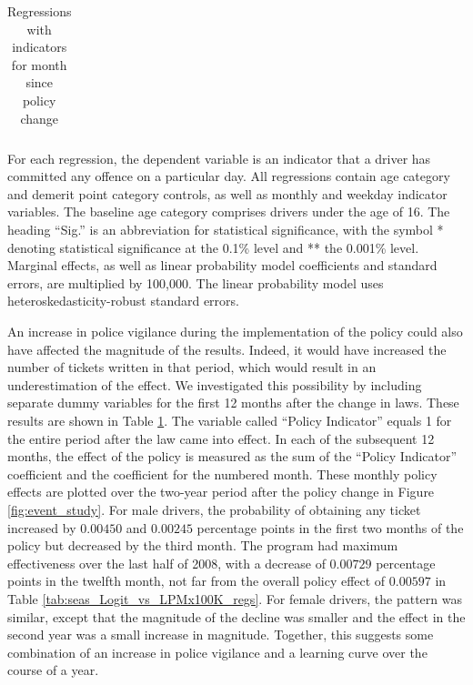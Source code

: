 \documentclass{cje}
\begin{document}
\begin{table}
\begin{tabular}{l r r r r l r r l}
\hline 

\end{tabular} 
\caption{Regressions with indicators for month since policy change} 
For each regression, the dependent variable is an indicator that a driver has committed  
any offence on a particular day.  
All regressions contain age category and demerit point category controls, 
as well as monthly and weekday indicator variables. 
The baseline age category comprises drivers under the age of 16. 
The heading ``Sig.'' is an abbreviation for statistical significance, with 
the symbol * denoting statistical significance at the 0.1\% level 
and ** the 0.001\% level. 
Marginal effects, as well as linear probability model coefficients and standard errors, are  
multiplied by 100,000.  
The linear probability model uses heteroskedasticity-robust standard errors. 
\label{tab:seas_Logit_vs_LPMx100K_event_month_regs} 
\end{table} 
 



An increase in police vigilance during the implementation of the policy 
could also have affected the magnitude of the results. 
Indeed, it would have increased the number of tickets written in that period, 
which would result in an underestimation of the effect. 
% 
We investigated this possibility by including separate dummy variables
for the first 12 months after the change in laws. 
These results are shown in 
Table \ref{tab:seas_Logit_vs_LPMx100K_event_month_regs}. 
The variable called ``Policy Indicator'' equals 1 for the entire period after
the law came into effect. 
In each of the subsequent 12 months, the effect of the policy is measured 
as the sum of the ``Policy Indicator'' coefficient 
and the coefficient for the numbered month. 
% 
These monthly policy effects are plotted over the two-year period 
after the policy change in Figure \ref{fig:event_study}.
% 
For male drivers, the probability of obtaining any ticket increased by 
$0.00450$ and $0.00245$ percentage points in the first two months of the policy
but decreased by the third month. 
The program had maximum effectiveness over the last half of 2008, 
with a decrease of $0.00729$ percentage points in the twelfth month,
not far from the overall policy effect of $0.00597$ in 
Table \ref{tab:seas_Logit_vs_LPMx100K_regs}. 
% 
For female drivers, the pattern was similar, except that the magnitude 
of the decline was smaller and the effect in the second year was a
small increase in magnitude. 
% 
Together, this suggests some combination of an increase in police vigilance 
and a learning curve over the course of a year. 
\end{document}
